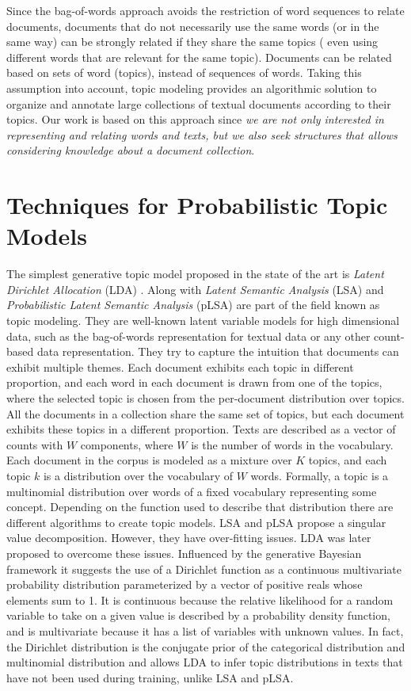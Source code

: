 Since the bag-of-words approach avoids the restriction of word sequences to relate documents, documents that do not necessarily use the same words (or in the same way) can be strongly related if they share the same topics ( even using different words that are relevant for the same topic). Documents can be related based on sets of word (topics), instead of sequences of words. Taking this assumption into account, topic modeling provides an algorithmic solution to organize and annotate large collections of textual documents according to their topics. Our work is based on this approach since \textit{we are not only interested in representing and relating words and texts, but we also seek structures that allows considering knowledge about a document collection}.



\section{Techniques for Probabilistic Topic Models}\label{sec:techniques-prob-topics}

The simplest generative topic model proposed in the state of the art is \textit{Latent Dirichlet Allocation} (LDA) \citep{Blei2003}. Along with \textit{Latent Semantic Analysis} (LSA) \citep{Deerwester1990} and \textit{Probabilistic Latent Semantic Analysis} (pLSA) \citep{Hofmann2001} are part of the field known as topic modeling. They are well-known latent variable models for high dimensional data, such as the bag-of-words representation for textual data or any other count-based data representation. They try to capture the intuition that documents can exhibit multiple themes. Each document exhibits each topic in different proportion, and each word in each document is drawn from one of the topics, where the selected topic is chosen from the per-document distribution over topics. All the documents in a collection share the same set of topics, but each document exhibits these topics in a different proportion. Texts are described as a vector of counts with $W$ components, where $W$ is the number of words in the vocabulary. Each document in the corpus is modeled as a mixture over $K$ topics, and each topic $k$ is a distribution over the vocabulary of $W$ words. Formally, a topic is a multinomial distribution over words of a fixed vocabulary representing some concept. Depending on the function used to describe that distribution there are different algorithms to create topic models. LSA and pLSA propose a singular value decomposition. However, they have over-fitting issues. LDA was later proposed to overcome these issues. Influenced by the generative Bayesian framework it  suggests the use of a Dirichlet function as a continuous multivariate probability distribution parameterized by a vector of positive reals whose elements sum to 1.  It is continuous because the relative likelihood for a random variable to take on a given value is described by a probability density function, and is multivariate because it has a list of variables with unknown values. In fact, the Dirichlet distribution is the conjugate prior of the categorical distribution and multinomial distribution and allows LDA to infer topic distributions in texts that have not been used during training, unlike LSA and pLSA.

